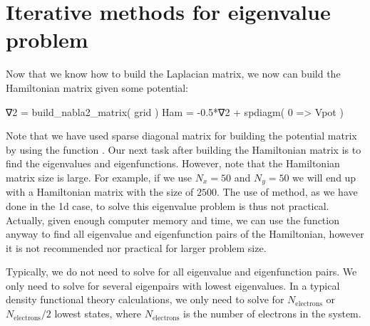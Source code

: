 \section{Iterative methods for eigenvalue problem}

Now that we know how to build the Laplacian matrix, we now can build the Hamiltonian
matrix given some potential:
\begin{juliacode}
∇2 = build_nabla2_matrix( grid )
Ham = -0.5*∇2 + spdiagm( 0 => Vpot )
\end{juliacode}
Note that we have used sparse diagonal matrix for building the potential matrix by
using the function .
Our next task after building the Hamiltonian matrix is to find the eigenvalues
and eigenfunctions.
However, note that the Hamiltonian matrix size is large.
For example, if we use $N_x=50$ and $N_y=50$ we will end up with a Hamiltonian
matrix with the size of $2500$.
The use of  method, as we have done in the 1d case,
to solve this eigenvalue problem is thus not practical.
Actually, given enough computer memory and time, we can use the function
 anyway to find all eigenvalue and eigenfunction pairs of
the Hamiltonian, however it is not recommended
nor practical for larger problem size.

Typically, we do not need to solve for all eigenvalue and eigenfunction pairs.
We only need to solve for several eigenpairs with lowest eigenvalues. In a typical density
functional theory calculations, we only need to solve for $N_{\mathrm{electrons}}$ or
$N_{\mathrm{electrons}}/2$ lowest states, where $N_{\mathrm{electrons}}$ is the number
of electrons in the system.

